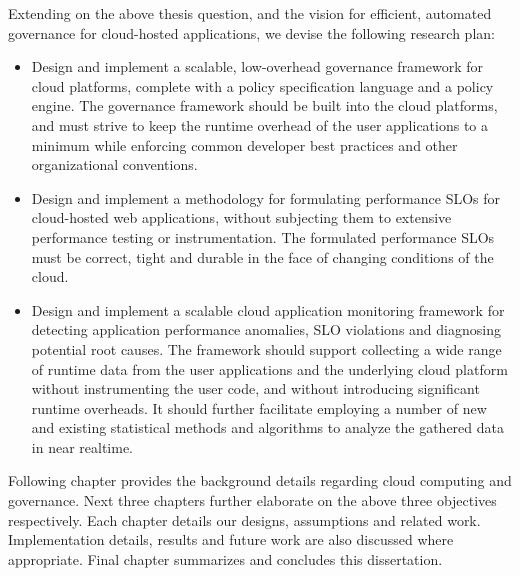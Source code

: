 Extending on the above thesis question, and the vision for efficient, automated governance for
cloud-hosted applications, we devise the following research plan:

\begin{itemize}
\item Design and implement a scalable, low-overhead governance framework for cloud platforms,
complete with a policy specification language and a policy engine. The governance framework should be
built into the cloud platforms, and must
strive to keep the runtime overhead of the user applications to a minimum while enforcing
common developer best practices and other organizational conventions.
\item Design and implement a methodology for formulating performance SLOs for cloud-hosted 
 web applications, without
 subjecting them to extensive performance testing or instrumentation. The formulated
 performance SLOs must be correct, tight and durable in the face of changing
 conditions of the cloud.
 \item Design and implement a scalable cloud application monitoring framework for detecting
application performance anomalies, SLO violations and diagnosing potential root causes. 
The framework should support collecting
 a wide range of runtime data from the user applications and the underlying cloud platform
 without instrumenting the user code, and without introducing significant runtime overheads.
 It should further facilitate employing a number of new and existing statistical methods
 and algorithms to analyze the gathered data in near realtime.
\end{itemize}

Following chapter provides the background details regarding cloud computing and governance.
Next three chapters further elaborate on the above three objectives respectively. 
Each chapter details our designs, assumptions and related work. Implementation details,
results and future work are also discussed where appropriate. Final chapter
summarizes and concludes this dissertation.